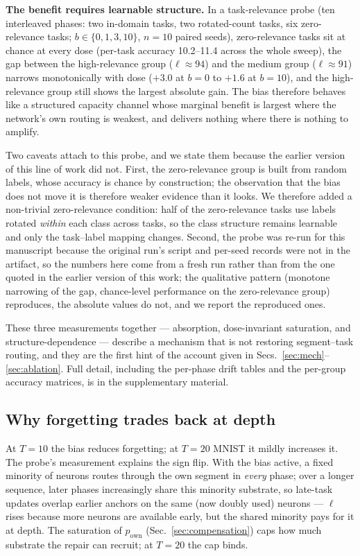 \documentclass[10pt]{article}
\newcommand{\own}{p_{\mathrm{own}}}
\begin{document}
\textbf{The benefit requires learnable structure.} In a task-relevance
probe (ten interleaved phases: two in-domain tasks, two rotated-count
tasks, six zero-relevance tasks; $b\in\{0,1,3,10\}$, $n=10$ paired seeds),
zero-relevance tasks sit at chance at every dose (per-task accuracy
10.2--11.4 across the whole
sweep), the gap between the high-relevance group
($\ell\approx94$) and the medium group
($\ell\approx91$) narrows monotonically with
dose ($+3.0$ at $b{=}0$ to $+1.6$ at
$b{=}10$), and the high-relevance group still shows the largest absolute
gain. The bias therefore behaves like a structured capacity channel whose
marginal benefit is largest where the network's own routing is weakest, and
delivers nothing where there is nothing to amplify.

Two caveats attach to this probe, and we state them because the earlier
version of this line of work did not. First, the zero-relevance group is
built from random labels, whose accuracy is chance by construction; the
observation that the bias does not move it is therefore weaker evidence
than it looks. We therefore added a non-trivial zero-relevance condition:
half of the zero-relevance tasks use labels rotated \emph{within} each
class across tasks, so the class structure remains learnable and only the
task--label mapping changes. Second, the probe was re-run for this
manuscript because the original run's script and per-seed records were not
in the artifact, so the numbers here come from a fresh run rather than from
the one quoted in the earlier version of this work; the qualitative
pattern (monotone narrowing of the gap, chance-level performance on the
zero-relevance group) reproduces, the absolute values do not, and we report
the reproduced ones.

These three measurements together --- absorption, dose-invariant
saturation, and structure-dependence --- describe a mechanism that is not
restoring segment--task routing, and they are the first hint of the
account given in Secs.~\ref{sec:mech}--\ref{sec:ablation}. Full detail,
including the per-phase drift tables and the per-group accuracy matrices,
is in the supplementary material.

\subsection{Why forgetting trades back at depth}
\label{sec:depthbwt}

At $T{=}10$ the bias reduces forgetting; at $T{=}20$ MNIST it mildly
increases it. The probe's measurement explains the sign flip. With the
bias active, a fixed minority of neurons routes through the own segment in
\emph{every} phase; over a longer sequence, later phases increasingly
share this minority substrate, so late-task updates overlap earlier
anchors on the same (now doubly used) neurons --- $\ell$ rises because
more neurons are available early, but the shared minority pays for it at
depth. The saturation of $\own$ (Sec.~\ref{sec:compensation}) caps how
much substrate the repair can recruit; at $T{=}20$ the cap binds.
\end{document}
